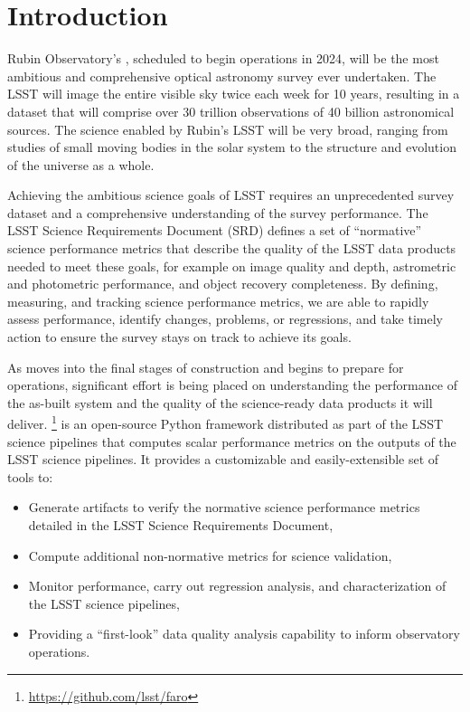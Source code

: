 \section{Introduction} \label{sec:intro}

Rubin Observatory's \lsst, scheduled to begin operations in 2024, will be the most ambitious and comprehensive optical astronomy survey ever undertaken\cite{2019ApJ...873..111I}.
The LSST will image the entire visible sky twice each week for 10 years, resulting in a dataset that will comprise over 30 trillion observations of 40 billion astronomical sources.
The science enabled by Rubin's LSST will be very broad, ranging from studies of small moving bodies in the solar system to the structure and evolution of the universe as a whole. 

Achieving the ambitious science goals of LSST requires an unprecedented survey dataset and a comprehensive understanding of the survey performance. 
The LSST Science Requirements Document (SRD)\cite{LPM-17} defines a set of ``normative'' science performance metrics that describe the quality of the LSST data products needed to meet these goals, for example on image quality and depth, astrometric and photometric performance, and object recovery completeness.
By defining, measuring, and tracking science performance metrics, we are able to rapidly assess performance, identify changes, problems, or regressions, and take timely action to ensure the survey stays on track to achieve its goals.

As \ro moves into the final stages of construction and begins to prepare for operations, significant effort is being placed on understanding the performance of the as-built system and the quality of the science-ready data products it will deliver.
\faro\footnote{\url{https://github.com/lsst/faro}} is an open-source Python framework distributed as part of the LSST science pipelines\cite{2019ASPC..523..521B,2018PASJ...70S...5B} that computes scalar performance metrics on the outputs of the LSST science pipelines.
It provides a customizable and easily-extensible set of tools to:
\begin{itemize}
\item Generate artifacts to verify the normative science performance metrics detailed in the LSST Science Requirements Document,
\item Compute additional non-normative metrics for science validation, 
\item Monitor performance, carry out regression analysis, and characterization of the LSST science pipelines, 
\item Providing a ``first-look'' data quality analysis capability to inform observatory operations.
\end{itemize}

